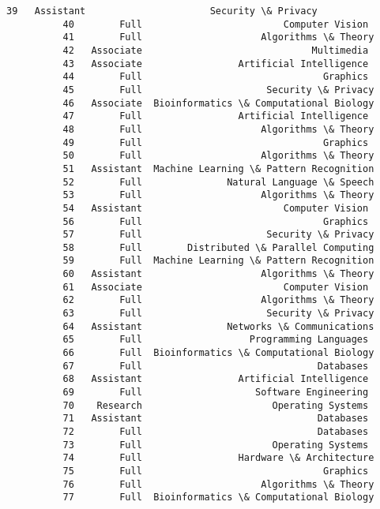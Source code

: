 \documentclass[11pt]{article}
\begin{document}
\begin{Verbatim}[commandchars=\\\{\}]
          39   Assistant                      Security \& Privacy   
          40        Full                         Computer Vision   
          41        Full                     Algorithms \& Theory   
          42   Associate                              Multimedia   
          43   Associate                 Artificial Intelligence   
          44        Full                                Graphics   
          45        Full                      Security \& Privacy   
          46   Associate  Bioinformatics \& Computational Biology   
          47        Full                 Artificial Intelligence   
          48        Full                     Algorithms \& Theory   
          49        Full                                Graphics   
          50        Full                     Algorithms \& Theory   
          51   Assistant  Machine Learning \& Pattern Recognition   
          52        Full               Natural Language \& Speech   
          53        Full                     Algorithms \& Theory   
          54   Assistant                         Computer Vision   
          56        Full                                Graphics   
          57        Full                      Security \& Privacy   
          58        Full        Distributed \& Parallel Computing   
          59        Full  Machine Learning \& Pattern Recognition   
          60   Assistant                     Algorithms \& Theory   
          61   Associate                         Computer Vision   
          62        Full                     Algorithms \& Theory   
          63        Full                      Security \& Privacy   
          64   Assistant               Networks \& Communications   
          65        Full                   Programming Languages   
          66        Full  Bioinformatics \& Computational Biology   
          67        Full                               Databases   
          68   Assistant                 Artificial Intelligence   
          69        Full                    Software Engineering   
          70    Research                       Operating Systems   
          71   Assistant                               Databases   
          72        Full                               Databases   
          73        Full                       Operating Systems   
          74        Full                 Hardware \& Architecture   
          75        Full                                Graphics   
          76        Full                     Algorithms \& Theory   
          77        Full  Bioinformatics \& Computational Biology   

\end{Verbatim}
\end{document}
